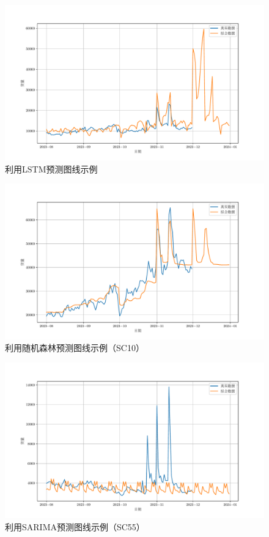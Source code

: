 \documentclass[UTF8]{article}%
\begin{document}
\begin{figure}[t]
	\centering
	\includegraphics*[width=0.8\linewidth]{images/LSTM_R.pdf}
	\caption{利用LSTM预测图线示例}
	\label{lstm}
\end{figure}
\begin{figure}[!ht]
	\centering
	\includegraphics*[width=0.8\linewidth]{images/pre_10.pdf}
	\caption{利用随机森林预测图线示例（SC10）}
	\label{rf}
\end{figure}

\begin{figure}[!ht]
	\centering
	\includegraphics*[width=0.8\linewidth]{images/pre_55.pdf}
	\caption{利用SARIMA预测图线示例（SC55）}
	\label{sarima}
\end{figure}
\end{document}
